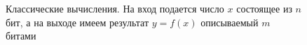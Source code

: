 \begin{figure}
\centering



\caption{Классические вычисления. На вход подается число $x$ состоящее
  из $n$ бит, а на выходе имеем результат $y = f\left(x\right)$ описываемый $m$ битами}
\label{figQuantCompClassComp}
\end{figure}
